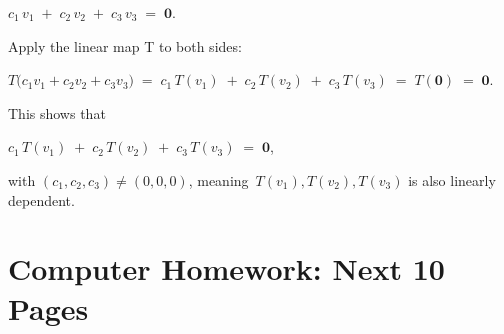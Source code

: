 \documentclass{article}
\begin{document}
$c_1\,v_1 \;+\; c_2\,v_2 \;+\; c_3\,v_3 \;=\;\mathbf{0}$.

Apply the linear map T to both sides:

$T\bigl(c_1 v_1 + c_2 v_2 + c_3 v_3\bigr)
\;=\;
c_1\,T(v_1) \;+\; c_2\,T(v_2) \;+\; c_3\,T(v_3)
\;=\;
T(\mathbf{0}) \;=\;\mathbf{0}$.

This shows that

$c_1\,T(v_1) \;+\; c_2\,T(v_2) \;+\; c_3\,T(v_3) \;=\;\mathbf{0}$,

with $(c_1,c_2,c_3)\neq(0,0,0)$, meaning $\,T(v_1),T(v_2),T(v_3)$ is also linearly dependent.
\pagebreak \section*{Computer Homework: Next 10 Pages}
\end{document}
